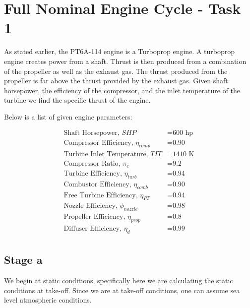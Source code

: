 \documentclass[titlepage]{article}
\begin{document}
    \section{Full Nominal Engine Cycle - Task 1}

    As stated earlier, the PT6A-114 engine is a Turboprop engine.
    A turboprop engine creates power from a shaft. Thrust is then produced from a combination of the propeller as well as the exhaust gas. The thrust produced from the propeller is far above the thrust provided by the exhaust gas. Given shaft horsepower, the efficiency of the compressor, and the inlet temperature of the turbine we find the specific thrust of the engine.

    Below is a list of given engine parameters:

    \begin{equation}
        \begin{aligned}
            \text{Shaft Horsepower, $SHP$} &= \text{600 hp} \\
            \text{Compressor Efficiency, $\eta_{comp}$} &= \text{0.90} \\
            \text{Turbine Inlet Temperature, $TIT$} &= \text{1410 K} \\
            \text{Compressor Ratio, $\pi_{c}$} &= \text{9.2} \\
            \text{Turbine Efficiency, $\eta_{turb}$} &= \text{0.94} \\
            \text{Combustor Efficiency, $\eta_{comb}$} &= \text{0.90} \\
            \text{Free Turbine Efficiency, $\eta_{PT}$} &= \text{0.94} \\
            \text{Nozzle Efficiency, $\phi_{nozzle}$} &= \text{0.98} \\
            \text{Propeller Efficiency, $\eta_{prop}$} &= \text{0.8} \\
            \text{Diffuser Efficiency, $\eta_{d}$} &= \text{0.99} \\
        \end{aligned}
    \end{equation}

    \subsection{Stage a}

    We begin at static conditions, specifically here we are calculating the static conditions at take-off. Since we are at take-off conditions, one can assume sea level atmospheric conditions.
\end{document}
